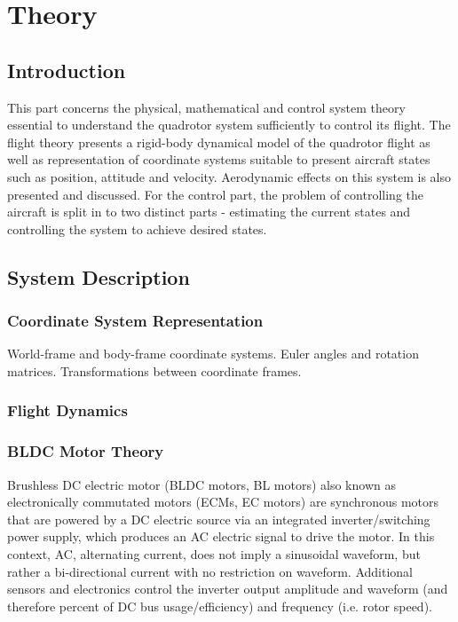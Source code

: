 \documentclass[a4paper]{report}
\begin{document}
%
%
\part{Theory}

\chapter{Introduction}
This part concerns the physical, mathematical and control system theory essential to understand the quadrotor system sufficiently to control its flight. The flight theory presents a rigid-body dynamical model of the quadrotor flight as well as representation of coordinate systems suitable to present aircraft states such as position, attitude and velocity. Aerodynamic effects on this system is also presented and discussed. For the control part, the problem of controlling the aircraft is split in to two distinct parts - estimating the current states and controlling the system to achieve desired states.

\chapter{System Description}

	\section{Coordinate System Representation}
World-frame and body-frame coordinate systems. Euler angles and rotation matrices. Transformations between coordinate frames.

	\section{Flight Dynamics}
	
	\section{BLDC Motor Theory}
	\label{sec:BLDCMotorTheory}
Brushless DC electric motor (BLDC motors, BL motors) also known as electronically commutated motors (ECMs, EC motors) are synchronous motors that are powered by a DC electric source via an integrated inverter/switching power supply, which produces an AC electric signal to drive the motor. In this context, AC, alternating current, does not imply a sinusoidal waveform, but rather a bi-directional current with no restriction on waveform. Additional sensors and electronics control the inverter output amplitude and waveform (and therefore percent of DC bus usage/efficiency) and frequency (i.e. rotor speed).
\end{document}
